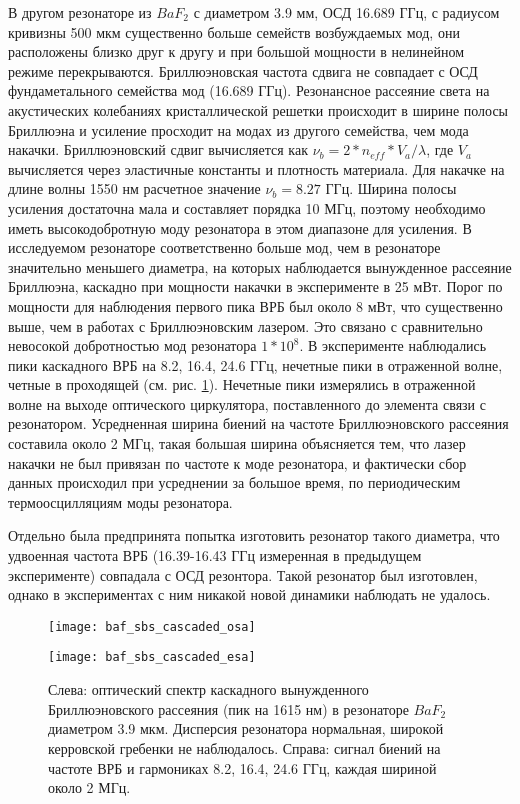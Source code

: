 В другом резонаторе из $BaF_2$ с диаметром 3.9 мм, ОСД 16.689 ГГц, с радиусом кривизны 500 мкм существенно больше семейств возбуждаемых мод, они расположены близко друг к другу и при большой мощности в нелинейном режиме перекрываются. Бриллюэновская частота сдвига не совпадает с ОСД фундаметального семейства мод (16.689 ГГц). Резонансное рассеяние света на акустических колебаниях кристаллической решетки происходит в ширине полосы Бриллюэна и усиление просходит на модах из другого семейства, чем мода накачки. Бриллюэновский сдвиг вычисляется как $\nu_b=2*n_{eff}*V_a/\lambda$, где $V_a$ вычисляется через эластичные константы и плотность материала. Для накачке на длине волны 1550 нм расчетное значение $\nu_b=8.27$ ГГц. Ширина полосы усиления достаточна мала и составляет порядка 10 МГц, поэтому необходимо иметь высокодобротную моду резонатора в этом диапазоне для усиления. В исследуемом резонаторе соответственно больше мод, чем в резонаторе значительно меньшего диаметра, на которых наблюдается вынужденное рассеяние Бриллюэна, каскадно при мощности накачки в эксперименте в 25 мВт. Порог по мощности для наблюдения первого пика ВРБ был около 8 мВт, что существенно выше, чем в работах с Бриллюэновским лазером. Это связано с сравнительно невосокой добротностью мод резонатора $1*10^8$. В эксперименте наблюдались пики каскадного ВРБ на 8.2, 16.4, 24.6 ГГц, нечетные пики в отраженной волне, четные в проходящей (см. рис. \ref{baf_sbs}). Нечетные пики измерялись в отраженной волне на выходе оптического циркулятора, поставленного до элемента связи с резонатором. Усредненная ширина биений на частоте Бриллюэновского рассеяния составила около 2 МГц, такая большая ширина объясняется тем, что лазер накачки не был привязан по частоте к моде резонатора, и фактически сбор данных происходил при усреднении за большое время, по периодическим термоосцилляциям моды резонатора.

Отдельно была предпринята попытка изготовить резонатор такого диаметра, что удвоенная частота ВРБ (16.39-16.43 ГГц измеренная в предыдущем эксперименте) совпадала с ОСД резонтора. Такой резонатор был изготовлен, однако в экспериментах с ним никакой новой динамики наблюдать не удалось.

\begin{figure}[ht]
\begin{minipage}[ht]{0.49\linewidth}\centering
    \texttt{[image: baf\_sbs\_cascaded\_osa]}
  \end{minipage}
  \hfill
  \begin{minipage}[ht]{0.49\linewidth}\centering
    \texttt{[image: baf\_sbs\_cascaded\_esa]}
  \end{minipage}
    \caption{Слева: оптический спектр каскадного вынужденного Бриллюэновского рассеяния (пик на 1615 нм) в резонаторе $BaF_2$ диаметром 3.9 мкм. Дисперсия резонатора нормальная, широкой керровской гребенки не наблюдалось. Справа: сигнал биений на частоте ВРБ и гармониках 8.2, 16.4, 24.6 ГГц, каждая шириной около 2 МГц.}
  \label{baf_sbs}
\end{figure}

